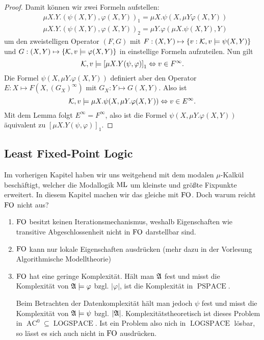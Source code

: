 \begin{proof}
	Damit können wir zwei Formeln aufstellen:
	\begin{align*}
		&\mu X . Y.(\psi(X,Y), \varphi(X,Y))_1 = \mu X . \psi(X, \mu Y \varphi(X,Y)) \\
		&\mu X . Y.(\psi(X,Y), \varphi(X,Y))_2 = \mu Y . \varphi(\mu X .\psi(X,Y), Y)
	\end{align*}
	um den zweistelligen Operator $(F, G)$ mit $F:(X,Y)\mapsto\{v : \mathcal{K},v\models \psi(X,Y)\}$ und $G:(X,Y)\mapsto\{\mathcal{K},v\models \varphi(X,Y)\}$ in einstellige Formeln aufzuteilen. Nun gilt 
	\[\mathcal{K},v \models \left[ \mu X.Y(\psi,\varphi)\right]_1 \Leftrightarrow v\in F^\infty.\]
	 Die Formel $\psi(X,\mu Y . \varphi(X,Y))$ definiert aber den Operator $E : X\mapsto F(X,(G_X)^\infty)$ mit $G_X : Y\mapsto G(X,Y)$. Also ist 
	\[\mathcal{K},v\models \mu X . \psi( X, \mu Y .\varphi(X,Y)) \Leftrightarrow v\in E^\infty.\]
	Mit dem Lemma folgt $E^\infty=F^\infty$, also ist die Formel $\psi(X,\mu Y . \varphi(X,Y))$ äquivalent zu $\left[ \mu X.Y(\psi,\varphi)\right]_1$.
\end{proof}


\subsection{Least Fixed-Point Logic}

Im vorherigen Kapitel haben wir uns weitgehend mit dem modalen $\mu$-Kalkül beschäftigt, welcher die Modallogik $\operatorname{ML}$ um kleinste und größte Fixpunkte erweitert.
In diesem Kapitel machen wir das gleiche mit $\operatorname{FO}$. Doch warum reicht $\operatorname{FO}$ nicht aus?
\begin{enumerate}
	\item $\operatorname{FO}$ besitzt keinen Iterationsmechanismus, weshalb Eigenschaften wie transitive Abgeschlossenheit nicht in $\operatorname{FO}$ darstellbar sind.
	\item $\operatorname{FO}$ kann nur lokale Eigenschaften ausdrücken (mehr dazu in der Vorlesung Algorithmische Modelltheorie)
	\item $\operatorname{FO}$ hat eine geringe Komplexität. Hält man $\mathfrak{A}$ fest und misst die Komplexität von $\mathfrak{A}\models\varphi$ bzgl. $\vert \varphi \vert$, ist die Komplexität in $\operatorname{PSPACE}$.
	
	Beim Betrachten der Datenkomplexität hält man jedoch $\psi$ fest und misst die Komplexität von $\mathfrak{A}\models\psi$ bzgl. $\vert\mathfrak{A}\vert$. Komplexitätstheoretisch ist dieses Problem in $\operatorname{AC}^0\subseteq \operatorname{LOGSPACE}$. Ist ein Problem also nich in $\operatorname{LOGSPACE}$ lösbar, so lässt es sich auch nicht in $\operatorname{FO}$ ausdrücken.
\end{enumerate}

